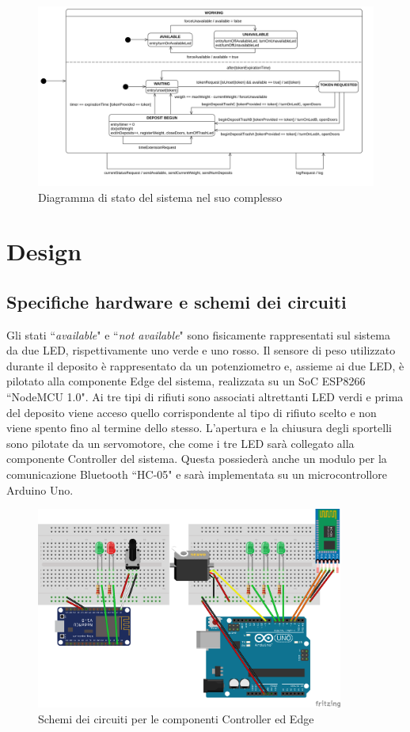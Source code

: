 \documentclass[a4paper, 12pt]{report}
\begin{document}
	\begin{figure}[H]
		\centering
		\includegraphics[width=\textwidth]{"img/SystemStatechart.png"}    
		\caption{Diagramma di stato del sistema nel suo complesso}
	\end{figure}
	\chapter{Design}
		\section{Specifiche hardware e schemi dei circuiti}
		Gli stati ``\textit{available}" e ``\textit{not available}" sono fisicamente rappresentati sul sistema da due LED,
		rispettivamente uno verde e uno rosso. Il sensore di peso utilizzato durante il deposito è
		rappresentato da un potenziometro e, assieme ai due LED, è pilotato alla componente Edge del
		sistema, realizzata su un SoC ESP8266 ``NodeMCU 1.0".\newline
		Ai tre tipi di rifiuti sono associati altrettanti LED verdi e prima del deposito viene acceso
		quello corrispondente al tipo di rifiuto scelto e non viene spento fino al termine dello stesso.
		L'apertura e la chiusura degli sportelli sono pilotate da un servomotore, che come i tre LED
		sarà collegato alla componente Controller del sistema. Questa possiederà anche un modulo per la
		comunicazione Bluetooth ``HC-05" e sarà implementata su un microcontrollore Arduino Uno.
		\begin{figure}[H]
			\centering
			\includegraphics[width=0.9\textwidth]{"img/HardwareSchemas.png"}    
			\caption{Schemi dei circuiti per le componenti Controller ed Edge}
		\end{figure}
\end{document}
